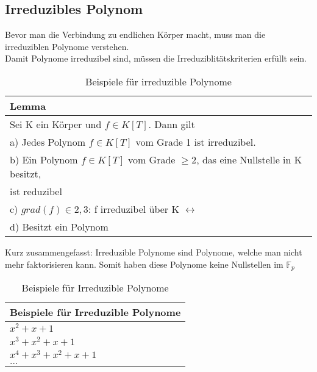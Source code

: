 \subsection*{Irreduzibles Polynom}


Bevor man die Verbindung zu endlichen Körper macht, muss man die irreduziblen Polynome verstehen.\\
Damit Polynome irreduzibel sind, müssen die Irreduziblitätskriterien erfüllt sein.\\

\begin{table}[!ht]
    \centering
        \begin{tabular}{l}
            \toprule
            \textbf{Lemma}\\
            \midrule
            Sei K ein Körper und $ f \in K[T]$. Dann gilt\\
            a) Jedes Polynom $ f \in K[T]$ vom Grade 1 ist irreduzibel.\\
            b) Ein Polynom $ f \in K[T]$ vom Grade $\geq 2$, das eine Nullstelle in K besitzt,\\
             ist reduzibel \\
            c) $grad(f) \in {2,3}$: f irreduzibel über K $ \leftrightarrow $ \\
            d) Besitzt ein Polynom $ $\\
           \bottomrule
        \end{tabular}
        \caption{Beispiele für irreduzible Polynome}
        \label{tab3}
    \end{table}


Kurz zusammengefasst: Irreduzible Polynome sind Polynome, welche man nicht mehr faktorisieren kann. Somit haben diese Polynome keine Nullstellen im $\mathbb{F}_{p} $


\begin{table}[!ht]
    \centering
        \begin{tabular}{l}
            \toprule
            \textbf{Beispiele für Irreduzible Polynome}\\
            \midrule
            $ x^2+ x + 1$\\
            $x^3 + x^2 + x + 1$ \\
            $x^4 + x^3  + x^2 + x + 1$\\
            $...$\\
           \bottomrule
        \end{tabular}
        \caption{Beispiele für Irreduzible Polynome}
        \label{tab3}
    \end{table}

